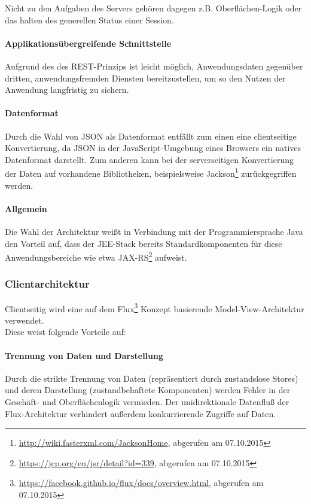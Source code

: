 \documentclass[12pt, xcolor=dvipsnames]{scrartcl}
\begin{document}
Nicht zu den Aufgaben des Servers gehören dagegen z.B. Oberflächen-Logik oder das halten des generellen Status einer Session.

\paragraph{Applikationsübergreifende Schnittstelle}
Aufgrund des des REST-Prinzips ist leicht möglich, Anwendungsdaten gegenüber dritten, anwendungsfremden Diensten bereitzustellen, um so den Nutzen der Anwendung langfristig zu sichern.

\paragraph{Datenformat}
Durch die Wahl von JSON als Datenformat entfällt zum einen eine clientseitige Konvertierung, da JSON in der JavaScript-Umgebung eines Browsers ein natives Datenformat darstellt. Zum anderen kann bei der serverseitigen Konvertierung der Daten auf vorhandene Bibliotheken, beispielsweise
Jackson\footnote{\url{http://wiki.fasterxml.com/JacksonHome}, abgerufen am 07.10.2015}
zurückgegriffen werden.

\paragraph{Allgemein}
Die Wahl der Architektur weißt in Verbindung mit der Programmiersprache Java den Vorteil auf, dass der JEE-Stack bereits Standardkomponenten für diese Anwendungsbereiche wie etwa
JAX-RS\footnote{\url{https://jcp.org/en/jsr/detail?id=339}, abgerufen am 07.10.2015}
aufweist.


\subsubsection{Clientarchitektur}

Clientseitig wird eine auf dem
Flux\footnote{\url{https://facebook.github.io/flux/docs/overview.html}, abgerufen am 07.10.2015} Konzept basierende Model-View-Architektur verwendet. \\

Diese weist folgende Vorteile auf:

\paragraph{Trennung von Daten und Darstellung}
Durch die strikte Trennung von Daten (repräsentiert durch zustandslose Stores) und deren Darstellung (zustandbehaftete Komponenten) werden Fehler in der Geschäft- und Oberflächenlogik vermieden. Der unidirektionale Datenfluß der Flux-Architektur verhindert außerdem konkurrierende Zugriffe auf Daten.
\end{document}
